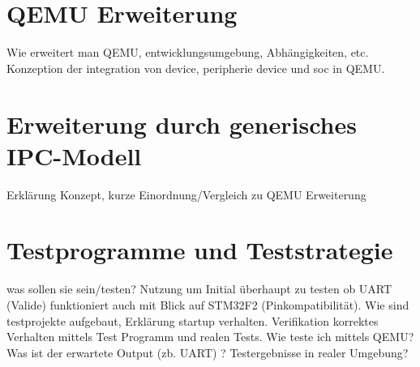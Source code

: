 \section{QEMU Erweiterung}
Wie erweitert man QEMU, entwicklungsumgebung, Abhängigkeiten, etc.
Konzeption der integration von device, peripherie device und soc in QEMU.

\section{Erweiterung durch generisches IPC-Modell}
Erklärung Konzept, kurze Einordnung/Vergleich zu QEMU Erweiterung

\section{Testprogramme und Teststrategie}
was sollen sie sein/testen?
Nutzung um Initial überhaupt zu testen ob UART (Valide) funktioniert auch mit
Blick auf STM32F2 (Pinkompatibilität).
Wie sind testprojekte aufgebaut, Erklärung startup verhalten.
Verifikation korrektes Verhalten mittels Test Programm und realen Tests.
Wie teste ich mittels QEMU?
Was ist der erwartete Output (zb. UART) ?
Testergebnisse in realer Umgebung?
